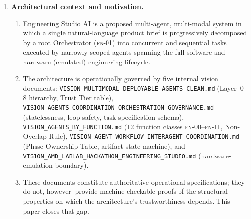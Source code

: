 \documentclass[12pt]{article}
\theoremstyle{definition}
\newcommand{\code}[1]{\texttt{#1}}
\newcommand{\FN}[1]{\textsc{fn-#1}}
\newcommand{\VisionClean}{\code{VISION\_MULTIMODAL\_\allowbreak DEPLOYABLE\_\allowbreak AGENTS\_CLEAN.md}}
\newcommand{\VisionGov}{\code{VISION\_AGENTS\_\allowbreak COORDINATION\_\allowbreak ORCHESTRATION\_\allowbreak GOVERNANCE.md}}
\newcommand{\VisionFunc}{\code{VISION\_AGENTS\_\allowbreak BY\_FUNCTION.md}}
\newcommand{\VisionFlow}{\code{VISION\_AGENT\_\allowbreak WORKFLOW\_\allowbreak INTERAGENT\_\allowbreak COORDINATION.md}}
\newcommand{\VisionHackathon}{\code{VISION\_AMD\_\allowbreak LABLAB\_\allowbreak HACKATHON\_\allowbreak ENGINEERING\_STUDIO.md}}
\begin{document}
\begin{enumerate}

    \item \textbf{Architectural context and motivation.}
    \begin{enumerate}
        \item[(1.1)] Engineering Studio AI is a proposed multi-agent,
              multi-modal system in which a single natural-language
              product brief is progressively decomposed by a root
              Orchestrator (\FN{01}) into concurrent and sequential
              tasks executed by narrowly-scoped agents spanning the
              full software and hardware (emulated) engineering
              lifecycle.
        \item[(1.2)] The architecture is operationally governed by five
              internal vision documents: \VisionClean{} (Layer~0--8
              hierarchy, Trust Tier table), \VisionGov{} (statelessness,
              loop-safety, task-specification schema), \VisionFunc{}
              (12 function classes \FN{00}--\FN{11}, Non-Overlap Rule),
              \VisionFlow{} (Phase Ownership Table, artifact state
              machine), and \VisionHackathon{} (hardware-emulation
              boundary).
        \item[(1.3)] These documents constitute authoritative operational
              specifications; they do not, however, provide
              machine-checkable proofs of the structural properties on
              which the architecture's trustworthiness depends.
              This paper closes that gap.
    \end{enumerate}


\end{enumerate}
\end{document}
